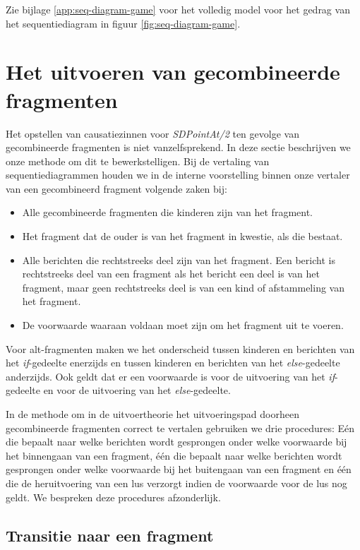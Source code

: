 Zie bijlage \ref{app:seq-diagram-game} voor het volledig model voor het gedrag van het sequentiediagram in figuur \ref{fig:seq-diagram-game}.


\section{Het uitvoeren van gecombineerde fragmenten}\label{sec:combined-fragment}
Het opstellen van causatiezinnen voor \textit{SDPointAt/2} ten gevolge van gecombineerde fragmenten is niet vanzelfsprekend. In deze sectie beschrijven we onze methode om dit te bewerkstelligen.
Bij de vertaling van sequentiediagrammen houden we in de interne voorstelling binnen onze vertaler van een gecombineerd fragment volgende zaken bij:

\begin{itemize}
	\item Alle gecombineerde fragmenten die kinderen zijn van het fragment.
	\item Het fragment dat de ouder is van het fragment in kwestie, als die bestaat.
	\item Alle berichten die rechtstreeks deel zijn van het fragment. Een bericht is rechtstreeks deel van een fragment als het bericht een deel is van het fragment, maar geen rechtstreeks deel is van een kind of afstammeling van het fragment.
	\item De voorwaarde waaraan voldaan moet zijn om het fragment uit te voeren. 
\end{itemize}

Voor alt-fragmenten maken we het onderscheid tussen kinderen en berichten van het \textit{if}-gedeelte enerzijds en tussen kinderen en berichten van het \textit{else}-gedeelte anderzijds. Ook geldt dat er een voorwaarde is voor de uitvoering van het \textit{if}-gedeelte en voor de uitvoering van het \textit{else}-gedeelte.

In de methode om in de uitvoertheorie het uitvoeringspad doorheen gecombineerde fragmenten correct te vertalen gebruiken we drie procedures: E\'en die bepaalt naar welke berichten wordt gesprongen onder welke voorwaarde bij het binnengaan van een fragment, \'e\'en die bepaalt naar welke berichten wordt gesprongen onder welke voorwaarde bij het buitengaan van een fragment en \'e\'en die de heruitvoering van een lus verzorgt indien de voorwaarde voor de lus nog geldt. We bespreken deze procedures afzonderlijk.

\subsection{Transitie naar een fragment}\label{sec:transition-to}

